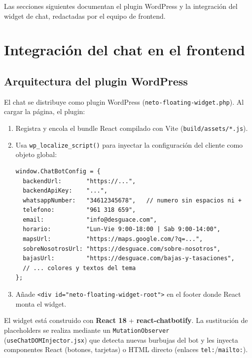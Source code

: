 \documentclass[12pt, a4paper]{article}
\begin{document}
\newpage
\begin{tcolorbox}[colback=moradoclaro, colframe=moradooscuro, fontupper=\normalsize\bfseries,
                  title={\large\bfseries\color{moradooscuro} Sección del equipo Frontend}]
Las secciones siguientes documentan el plugin WordPress y la integración del widget de chat,
redactadas por el equipo de frontend.
\end{tcolorbox}

\section{Integración del chat en el frontend}

\subsection{Arquitectura del plugin WordPress}

El chat se distribuye como plugin WordPress (\texttt{neto-floating-widget.php}).
Al cargar la página, el plugin:

\begin{enumerate}[noitemsep]
  \item Registra y encola el bundle React compilado con Vite (\texttt{build/assets/*.js}).
  \item Usa \texttt{wp\_localize\_script()} para inyectar la configuración del cliente como objeto global:
\begin{lstlisting}[style=js]
window.ChatBotConfig = {
  backendUrl:       "https://...",
  backendApiKey:    "...",
  whatsappNumber:   "34612345678",   // numero sin espacios ni +
  telefono:         "961 318 659",
  email:            "info@desguace.com",
  horario:          "Lun-Vie 9:00-18:00 | Sab 9:00-14:00",
  mapsUrl:          "https://maps.google.com/?q=...",
  sobreNosotrosUrl: "https://desguace.com/sobre-nosotros",
  bajasUrl:         "https://desguace.com/bajas-y-tasaciones",
  // ... colores y textos del tema
};
\end{lstlisting}
  \item Añade \texttt{<div id="neto-floating-widget-root">} en el footer donde React monta el widget.
\end{enumerate}

El widget está construido con \textbf{React 18} + \textbf{react-chatbotify}. La sustitución de placeholders se realiza mediante un \texttt{MutationObserver} (\texttt{useChatDOMInjector.jsx}) que detecta nuevas burbujas del bot y les inyecta componentes React (botones, tarjetas) o HTML directo (enlaces \texttt{tel:}/\texttt{mailto:}).
\end{document}
